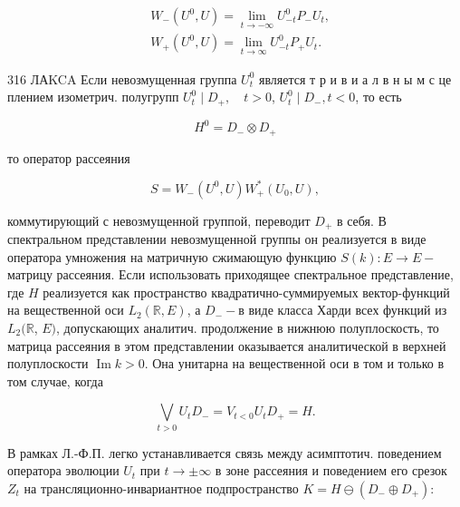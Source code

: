 \documentclass[10pt]{article}
\begin{document}
\[

\begin{aligned}

& W_{-}\left(U^{0}, U\right)=\lim _{t \rightarrow-\infty} U_{-t}^{0} P_{-} U_{t}, \\

& W_{+}\left(U^{0}, U\right)=\lim _{t \rightarrow \infty} U_{-t}^{0} P_{+} U_{t} .

\end{aligned}

\]



316 ЛАKCA Если невозмущенная группа $U_{t}^{0}$ является т р и в и а л в н ы м с це плением изометрич. полугрупп $U_{t}^{0} \mid D_{+}, \quad t>0$, $U_{t}^{0} \mid D_{-}, t<0$, то есть



\[

H^{0}=D_{-} \otimes D_{+}

\]



то оператор рассеяния



\[

S=W_{-}\left(U^{0}, U\right) W_{+}^{*}\left(U_{0}, U\right),

\]



коммутирующий с невозмущенной группой, переводит $D_{+}$ в себя. В спектральном представлении невозмущенной группы он реализуется в виде оператора умножения на матричную сжимающую функцию $S(k): E \rightarrow E-$ матрицу рассеяния. Если использовать приходящее спектральное представление, где $H$ реализуется как пространство квадратично-суммируемых вектор-функций на вещественной оси $L_{2}(\mathbb{R}, E)$, а $D_{-}-$в виде класса Харди всех функций из $L_{2}(\mathbb{R}$, $E)$, допускающих аналитич. продолжение в нижнюю полуплоскость, то матрица рассеяния в этом представлении оказывается аналитической в верхней полуплоскости $\operatorname{Im} k>0$. Она унитарна на вещественной оси в том и только в том случае, когда



\[

\bigvee_{t>0} U_{t} D_{-}=V_{t<0} U_{t} D_{+}=H .

\]



В рамках Л.-Ф.П. легко устанавливается связь между асимптотич. поведением оператора эволюции $U_{t}$ при $t \rightarrow \pm \infty$ в зоне рассеяния и поведением его срезок $Z_{t}$ на трансляционно-инвариантное подпространство $K=H \ominus\left(D_{-} \oplus D_{+}\right):$
\end{document}
